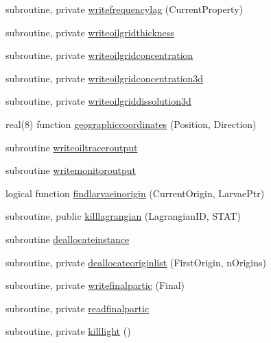 \begin{DoxyCompactItemize}
\item 
subroutine, private \mbox{\hyperlink{namespacemodulelagrangian_a73f212ed028e8e36231a715754b12d20}{writefrequencylag}} (Current\+Property)
\item 
subroutine, private \mbox{\hyperlink{namespacemodulelagrangian_a8e2a2d0598e7ab5be827b9dd3693d75d}{writeoilgridthickness}}
\item 
subroutine, private \mbox{\hyperlink{namespacemodulelagrangian_a8b7319e82910c93802b83b6f1391023e}{writeoilgridconcentration}}
\item 
subroutine, private \mbox{\hyperlink{namespacemodulelagrangian_acf6d490f27a032fae7ae0cf84c95989b}{writeoilgridconcentration3d}}
\item 
subroutine, private \mbox{\hyperlink{namespacemodulelagrangian_a31ce964f62f42f4eede762da9d6b5d88}{writeoilgriddissolution3d}}
\item 
real(8) function \mbox{\hyperlink{namespacemodulelagrangian_ad718f547ef233587149bd01b55f9e9dd}{geographiccoordinates}} (Position, Direction)
\item 
subroutine \mbox{\hyperlink{namespacemodulelagrangian_af05b4830d15cd47fd3ed67c7bbffda15}{writeoiltraceroutput}}
\item 
subroutine \mbox{\hyperlink{namespacemodulelagrangian_a34b406709c4bc499c1d075b26e741c0b}{writemonitoroutput}}
\item 
logical function \mbox{\hyperlink{namespacemodulelagrangian_a4a81291f0f83c4c244a6842be5d88471}{findlarvaeinorigin}} (Current\+Origin, Larvae\+Ptr)
\item 
subroutine, public \mbox{\hyperlink{namespacemodulelagrangian_a18d99349731a3f837e18c16f49c3743f}{killlagrangian}} (Lagrangian\+ID, S\+T\+AT)
\item 
subroutine \mbox{\hyperlink{namespacemodulelagrangian_a43ea933b1bd63328af5b5fde1d41787a}{deallocateinstance}}
\item 
subroutine, private \mbox{\hyperlink{namespacemodulelagrangian_a3f11dfb687cee81738d6fd8944750d72}{deallocateoriginlist}} (First\+Origin, n\+Origins)
\item 
subroutine, private \mbox{\hyperlink{namespacemodulelagrangian_a5d2088faec6c07d9907d57eacfc167ae}{writefinalpartic}} (Final)
\item 
subroutine, private \mbox{\hyperlink{namespacemodulelagrangian_aa8ba43a560dd11df5632a522066b74a6}{readfinalpartic}}
\item 
subroutine, private \mbox{\hyperlink{namespacemodulelagrangian_a2f00972bf015601fb8181bb28eb89850}{killlight}} ()

\end{DoxyCompactItemize}
